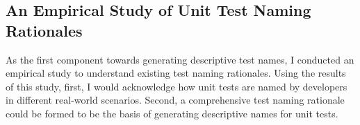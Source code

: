 \subsection{An Empirical Study of Unit Test Naming Rationales}
\label{sec:emp-study}

As the first component towards generating descriptive test names, I conducted an empirical study to understand existing test naming rationales.
%
Using the results of this study, first, I would acknowledge how unit tests are named by developers in different real-world scenarios.
%
Second, a comprehensive test naming rationale could be formed to be the basis of generating descriptive names for unit tests.